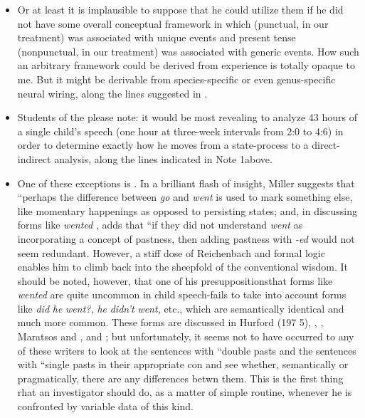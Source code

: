 \begin{itemize}
\begin{itemize}
\begin{itemize}
\begin{itemize}
\begin{itemize}
\begin{itemize}
\begin{itemize}
\begin{itemize}
\begin{itemize}
\item Or at least it is implausible to suppose that he could utilize them if he did not have some overall conceptual framework in which  (punctual, in our treatment) was associated with unique events and present tense (nonpunctual, in our treatment) was associ\-ated with generic events. How such an arbitrary framework could be derived from experience is totally opaque to me. But it might be derivable from species-specific or even genus-specific neural wiring, along the lines suggested in .
\item Students of the   please note: it would be most revealing to analyze 43 hours of a single child's speech (one hour at three-week intervals from 2:0 to 4:6) in order to determine exactly how he moves from a state-process to a direct-indirect analysis, along the lines indicated in Note 1above.
\item One of these exceptions is \citet{Miller1978}. In a brilliant flash of insight, Miller suggests that ``perhaps the difference between \textit{go} and \textit{went} is used to mark something else, like momentary happen\-ings as opposed to persisting states{\textquotedbl}; and, in discussing forms like \textit{wented} , adds that ``if they did not understand \textit{went} as incorporating a concept of pastness, then adding pastness with \textit{{}-ed} would not seem redundant. However, a stiff dose of Reichenbach and formal logic enables him to climb back into the sheepfold of the conventional wisdom. It should be noted, however, that one of his presuppositions\-that forms like \textit{wented} are quite uncommon in child speech-fails to take into account forms like \textit{did} \textit{he} \textit{went?,} \textit{he} \textit{didn't} \textit{went,} etc., which are semantically identical and much more common. These forms are discussed in Hurford (197 5), \citet{Kuczaj1976}, \citet{Fay1978}, Maratsos and \citet{Kuczaj1978}, and \citet{ErreichEtAl1980}; but unfortunately, it seems not to have occurred to any of these writers to look at the sentences with ``double pasts and the sentences with ``single pasts in their appropriate con and see whether, semantically or pragmatically, there are any differences betwn them. This is the first thing rhat an investigator should do, as a matter of simple routine, whenever he is confronted by variable data of this kind.


\end{itemize}
\end{itemize}
\end{itemize}
\end{itemize}
\end{itemize}
\end{itemize}
\end{itemize}
\end{itemize}
\end{itemize}
